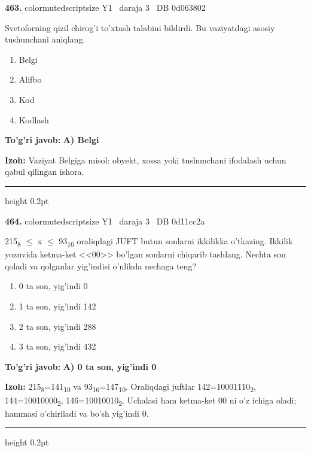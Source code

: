 \documentclass[10pt,a4paper,oneside]{article}
\begin{document}
\noindent\textbf{\color{ink}463.}  {color{muted}scriptsize Y1 \textbullet\ daraja 3 \textbullet\ DB 0d063802}
\par
Svetoforning qizil chirog'i to'xtash talabini bildirdi. Bu vaziyatdagi asosiy tushunchani aniqlang.
\begin{enumerate}[label=\Alph*),leftmargin=9mm]
\item Belgi
\item Alifbo
\item Kod
\item Kodlash
\end{enumerate}
\begin{tcolorbox}[enhanced,breakable,colback=teal!4,colframe=teal!50!black,boxrule=0.5pt,arc=1.1mm,left=3mm,right=3mm,top=1.7mm,bottom=1.7mm,before skip=2mm,after skip=2mm]
\textbf{\color{teal}To'g'ri javob:} \textbf{A) Belgi}
\par\smallskip
\textbf{Izoh:} Vaziyat Belgiga misol: obyekt, xossa yoki tushunchani ifodalash uchun qabul qilingan ishora.
\end{tcolorbox}
\vspace{2mm}\hrule height 0.2pt \vspace{3mm}

\noindent\textbf{\color{ink}464.}  {color{muted}scriptsize Y1 \textbullet\ daraja 3 \textbullet\ DB 0d11cc2a}
\par
215\textsubscript{8} \ensuremath{\leq} x \ensuremath{\leq} 93\textsubscript{1}\textsubscript{6} oraliqdagi JUFT butun sonlarni ikkilikka o'tkazing. Ikkilik yozuvida ketma-ket <<00>> bo'lgan sonlarni chiqarib tashlang. Nechta son qoladi va qolganlar yig'indisi o'nlikda nechaga teng?
\begin{enumerate}[label=\Alph*),leftmargin=9mm]
\item 0 ta son, yig'indi 0
\item 1 ta son, yig'indi 142
\item 2 ta son, yig'indi 288
\item 3 ta son, yig'indi 432
\end{enumerate}
\begin{tcolorbox}[enhanced,breakable,colback=teal!4,colframe=teal!50!black,boxrule=0.5pt,arc=1.1mm,left=3mm,right=3mm,top=1.7mm,bottom=1.7mm,before skip=2mm,after skip=2mm]
\textbf{\color{teal}To'g'ri javob:} \textbf{A) 0 ta son, yig'indi 0}
\par\smallskip
\textbf{Izoh:} 215\textsubscript{8}=141\textsubscript{1}\textsubscript{0} va 93\textsubscript{1}\textsubscript{6}=147\textsubscript{1}\textsubscript{0}. Oraliqdagi juftlar 142=10001110\textsubscript{2}, 144=10010000\textsubscript{2}, 146=10010010\textsubscript{2}. Uchalasi ham ketma-ket 00 ni o'z ichiga oladi; hammasi o'chiriladi va bo'sh yig'indi 0.
\end{tcolorbox}
\vspace{2mm}\hrule height 0.2pt \vspace{3mm}
\end{document}

